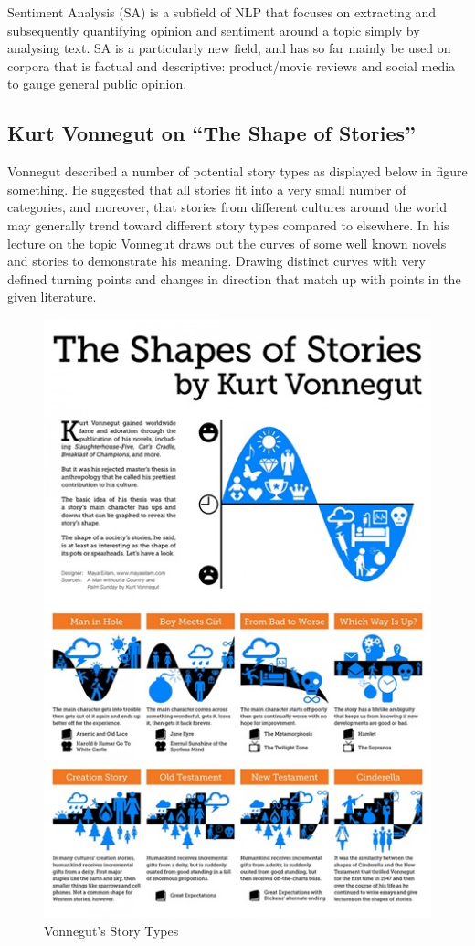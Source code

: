 \documentclass{article}
\begin{document}
        Sentiment Analysis (SA) is a subfield of NLP that focuses on extracting and subsequently quantifying opinion and sentiment around a topic simply by analysing text. SA is a particularly new field, and has so far mainly be used on corpora that is factual and descriptive: product/movie reviews and social media to gauge general public opinion.
    \subsection{Kurt Vonnegut on ``The Shape of Stories''}
        Vonnegut described a number of potential story types as displayed below in figure something. He suggested that all stories fit into a very small number of categories, and moreover, that stories from different cultures around the world may generally trend toward different story types compared to elsewhere. In his lecture on the topic Vonnegut draws out the curves of some well known novels and stories to demonstrate his meaning. Drawing distinct curves with very defined turning points and changes in direction that match up with points in the given literature.
        \begin{figure}
            \centering
            \includegraphics{Misc/VonnegutShapes}
            \caption{Vonnegut's Story Types}
            \label{fig:storyTypes}
        \end{figure}
\end{document}

